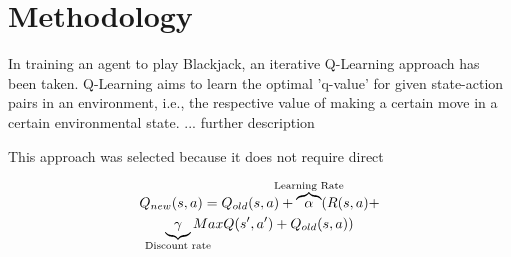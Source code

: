 \section{Methodology}



In training an agent to play Blackjack, an iterative Q-Learning approach has been taken. Q-Learning aims to learn the optimal 'q-value' for given state-action pairs in an environment, i.e., the respective value of making a certain move in a certain environmental state. ... further description

This approach was selected because it does not require direct 


\begin{multline}
    Q_{new}(s,a)=Q_{old}(s,a)+\overbrace{\alpha}^{\mathclap{\text{Learning Rate}}}(R(s,a)+\\ \underbrace{\gamma}_{\mathclap{\text{Discount rate}}}MaxQ(s',a')+Q_{old}(s,a))
\end{multline}